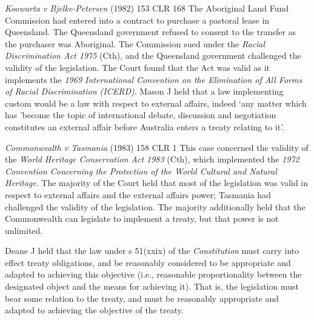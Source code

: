 \begin{casedetails}{\textit{Koowarta v Bjelke-Petersen} (1982) 153 CLR 168}\label{case:Koowarta v Bjelke-Petersen}
    \flushleft
    The Aboriginal Land Fund Commission had entered into a contract to purchase a pastoral lease in Queensland. The Queensland government refused to consent to the transfer as the purchaser was Aboriginal. The Commission sued under the \textit{Racial Discrimination Act 1975} (Cth), and the Queensland government challenged the validity of the legislation. The Court found that the Act was valid as it implements the \textit{1969 International Convention on the Elimination of All Forms of Racial Discrimination (ICERD)}. Mason J held that a law implementing custom would be a law with respect to external affairs, indeed `any matter which has 'become the topic of international debate, discussion and negotiation constitutes an external affair before Australia enters a treaty relating to it'.
\end{casedetails}

\begin{casedetails}{\textit{Commonwealth v Tasmania} (1983) 158 CLR 1}\label{case:Commonwealth v Tasmania}
    \flushleft
    This case concerned the validity of the \textit{World Heritage Conservation Act 1983} (Cth), which implemented the \textit{1972 Convention Concerning the Protection of the World Cultural and Natural Heritage}. The majority of the Court held that most of the legislation was valid in respect to external affairs and the external affairs power; Tasmania had challenged the validity of the legislation. The majority additionally held that the Commonwealth can legislate to implement a treaty, but that power is not unlimited.

    \vspace{\baselineskip}

    Deane J held that the law under s 51(xxix) of the \textit{Constitution} must carry into effect treaty obligations, and be reasonably considered to be appropriate and adapted to achieving this objective (i.e., reasonable proportionality between the designated object and the means for achieving it). That is, the legislation must bear some relation to the treaty, and must be reasonably appropriate and adapted to achieving the objective of the treaty.
\end{casedetails}

